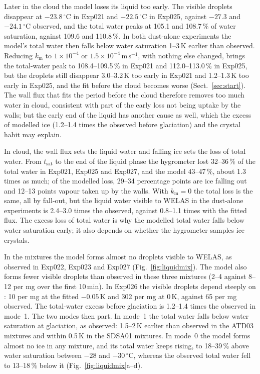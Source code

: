 Later in the cloud the model loses its liquid too early. The visible droplets disappear at $-23.8\,^\circ$C in Exp021 and $-22.5\,^\circ$C in Exp025, against $-27.3$ and $-24.1\,^\circ$C observed, and the total water peaks at 105.1 and 108.7\,\% of water saturation, against 109.6 and 110.8\,\%. In both dust-alone experiments the model's total water then falls below water saturation 1--3\,K earlier than observed. Reducing $k_\mathrm{m}$ to $1\times10^{-4}$ or $1.5\times10^{-4}$\,m\,s$^{-1}$, with nothing else changed, brings the total-water peak to 108.4--109.5\,\% in Exp021 and 112.0--113.0\,\% in Exp025, but the droplets still disappear 3.0--3.2\,K too early in Exp021 and 1.2--1.3\,K too early in Exp025, and the fit before the cloud becomes worse (Sect.~\ref{sec:start}). The wall flux that fits the period before the cloud therefore removes too much water in cloud, consistent with part of the early loss not being uptake by the walls; but the early end of the liquid has another cause as well, which the excess of modelled ice (1.2--1.4 times the observed before glaciation) and the crystal habit may explain. 

In cloud, the wall flux sets the liquid water and falling ice sets the loss of total water. From $t_\mathrm{sat}$ to the end of the liquid phase the hygrometer lost 32--36\,\% of the total water in Exp021, Exp025 and Exp027, and the model 43--47\,\%, about 1.3 times as much; of the modelled loss, 29--34 percentage points are ice falling out and 12--13 points vapour taken up by the walls. With $k_\mathrm{m} = 0$ the total loss is the same, all by fall-out, but the liquid water visible to WELAS in the dust-alone experiments is 2.4--3.0 times the observed, against 0.8--1.1 times with the fitted flux. The excess loss of total water is why the modelled total water falls below water saturation early; it also depends on whether the hygrometer samples ice crystals. 

In the mixtures the model forms almost no droplets visible to WELAS, as observed in Exp022, Exp023 and Exp027 (Fig.~\ref{fig:liquidmix}). The model also forms fewer visible droplets than observed in these three mixtures (2--4 against 8--12 per mg over the first 10\,min). In Exp026 the visible droplets depend steeply on \dTBL: 10 per mg at the fitted $-0.05$\,K and 302 per mg at 0\,K, against 65 per mg observed. The total-water excess before glaciation is 1.2--1.4 times the observed in mode~1. The two modes then part. In mode~1 the total water falls below water saturation at glaciation, as observed: 1.5--2\,K earlier than observed in the ATD03 mixtures and within 0.5\,K in the SDSA01 mixtures. In mode~0 the model forms almost no ice in any mixture, and its total water keeps rising, to 18--39\,\% above water saturation between $-28$ and $-30\,^\circ$C, whereas the observed total water fell to 13--18\,\% below it (Fig.~\ref{fig:liquidmix}a--d).

